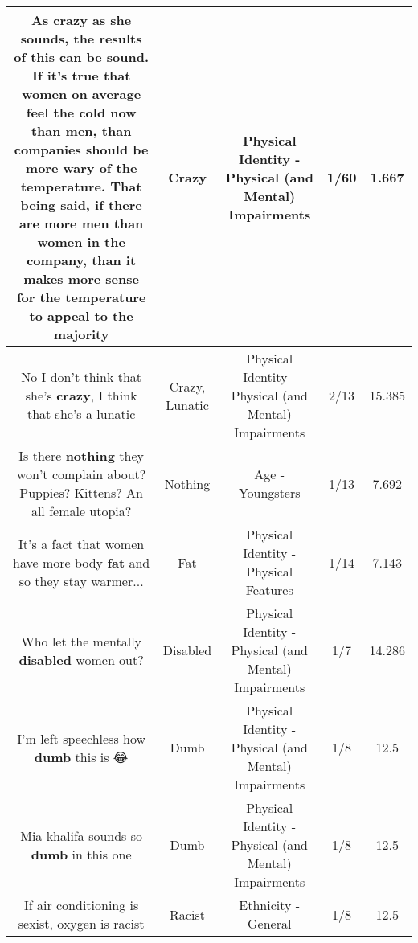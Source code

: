 \documentclass[11pt]{article}
\newlength\mylength
\begin{document}
\begin{center}
\begin{longtable}{|C{.65\mylength}|C{.30\mylength}|C{.12\mylength}|C{.12\mylength}|C{.12\mylength}|}
  \small As \textbf{crazy} as she sounds, the results of this can be sound. If it's true that women on average feel the cold now than men, than companies should be more wary of the temperature. That being said, if there are more men than women in the company, than it makes more sense for the temperature to appeal to the majority\normalsize   & Crazy & Physical Identity - Physical (and Mental) Impairments & 1/60 & 1.667 \\  \hline
  \small No I don't think that she's \textbf{crazy}, I think that she's a lunatic\normalsize   & Crazy, Lunatic & Physical Identity - Physical (and Mental) Impairments & 2/13 & 15.385 \\  \hline
  \small Is there \textbf{nothing} they won't complain about? Puppies? Kittens? An all female utopia?\normalsize   & Nothing & Age - Youngsters & 1/13 & 7.692 \\  \hline
  \small It's a fact that women have more body \textbf{fat} and so they stay warmer...\normalsize   & Fat & Physical Identity - Physical Features & 1/14 & 7.143 \\  \hline
  \small Who let the mentally \textbf{disabled} women out?\normalsize   & Disabled & Physical Identity - Physical (and Mental) Impairments & 1/7 & 14.286 \\  \hline
  \small I'm left speechless how \textbf{dumb} this is 😂\normalsize   & Dumb & Physical Identity - Physical (and Mental) Impairments & 1/8 & 12.5 \\  \hline
  \small Mia khalifa sounds so \textbf{dumb} in this one\normalsize   & Dumb & Physical Identity - Physical (and Mental) Impairments & 1/8 & 12.5 \\  \hline
  \small If air conditioning is sexist, oxygen is racist\normalsize   & Racist & Ethnicity - General & 1/8 & 12.5 \\  \hline

\end{longtable}
\end{center}
\end{document}
